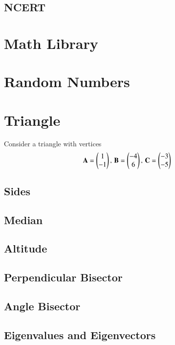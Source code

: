 \documentclass[journal]{IEEEtran}
\begin{document}
\subsection{NCERT}

\section{Math Library}

\section{Random Numbers}

\newpage
\appendices
\section{Triangle}
Consider a triangle with vertices
		\begin{align}
			\label{eq:app-tri-pts}
			\mathbf{A} = \begin{pmatrix}1 \\ -1\end{pmatrix},\,
			\mathbf{B} = \begin{pmatrix}-4 \\ 6\end{pmatrix},\,
			\mathbf{C} = \begin{pmatrix}-3 \\ -5\end{pmatrix}
		\end{align}
\subsection{Sides}

\subsection{Median}

\subsection{Altitude}

\subsection{Perpendicular Bisector}

\subsection{Angle Bisector}

\subsection{Eigenvalues and Eigenvectors}

\end{document}
